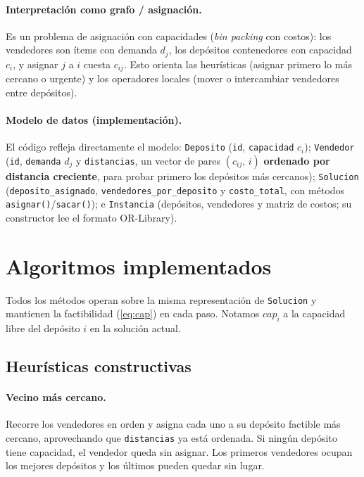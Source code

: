 \documentclass[11pt,a4paper]{article}
\newcommand{\code}[1]{\texttt{#1}}
\begin{document}
\paragraph{Interpretación como grafo / asignación.} Es un problema de asignación con capacidades
(\emph{bin packing} con costos): los vendedores son ítems con demanda $d_j$, los depósitos
contenedores con capacidad $c_i$, y asignar $j$ a $i$ cuesta $c_{ij}$. Esto orienta las
heurísticas (asignar primero lo más cercano o urgente) y los operadores locales (mover o
intercambiar vendedores entre depósitos).

\paragraph{Modelo de datos (implementación).} El código refleja directamente el modelo:
\code{Deposito} (\code{id}, \code{capacidad} $c_i$); \code{Vendedor} (\code{id}, \code{demanda}
$d_j$ y \code{distancias}, un vector de pares $(c_{ij},\,i)$ \textbf{ordenado por distancia
creciente}, para probar primero los depósitos más cercanos); \code{Solucion}
(\code{deposito\_asignado}, \code{vendedores\_por\_deposito} y \code{costo\_total}, con métodos
\code{asignar()}/\code{sacar()}); e \code{Instancia} (depósitos, vendedores y matriz de costos;
su constructor lee el formato OR-Library).


\section{Algoritmos implementados}
Todos los métodos operan sobre la misma representación de \code{Solucion} y mantienen la
factibilidad (\eqref{eq:cap}) en cada paso. Notamos $cap_i$ a la capacidad libre del depósito
$i$ en la solución actual.

\subsection{Heurísticas constructivas}
\paragraph{Vecino más cercano.} Recorre los vendedores en orden y asigna cada uno a su
depósito factible más cercano, aprovechando que \code{distancias} ya está ordenada. Si ningún
depósito tiene capacidad, el vendedor queda sin asignar. Los
primeros vendedores ocupan los mejores depósitos y los últimos pueden quedar sin lugar.
\end{document}
